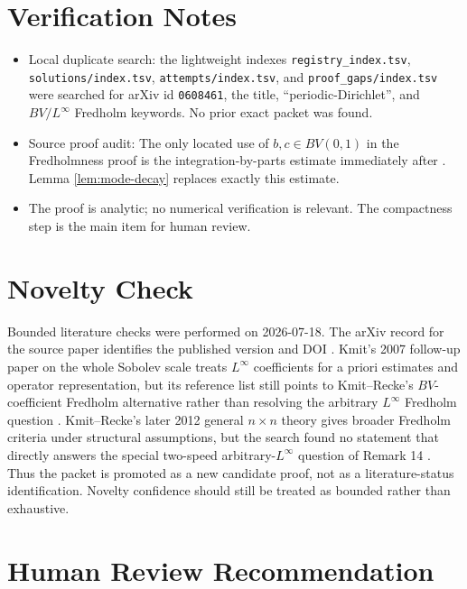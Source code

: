\documentclass[11pt]{article}
\begin{document}
\section*{Verification Notes}

\begin{itemize}
\item Local duplicate search: the lightweight indexes
\texttt{registry\_index.tsv}, \texttt{solutions/index.tsv},
\texttt{attempts/index.tsv}, and \texttt{proof\_gaps/index.tsv} were searched
for arXiv id \texttt{0608461}, the title, ``periodic-Dirichlet'', and
\(BV/L^\infty\) Fredholm keywords. No prior exact packet was found.
\item Source proof audit: The only located use of \(b,c\in BV(0,1)\) in the
Fredholmness proof is the integration-by-parts estimate immediately after
\cite[(4.10)]{KmitRecke2007}. Lemma \ref{lem:mode-decay} replaces exactly this
estimate.
\item The proof is analytic; no numerical verification is relevant. The
compactness step is the main item for human review.
\end{itemize}

\section*{Novelty Check}

Bounded literature checks were performed on 2026-07-18. The arXiv record for
the source paper identifies the published version and DOI \cite{KmitRecke2007}.
Kmit's 2007 follow-up paper on the whole Sobolev scale treats \(L^\infty\)
coefficients for a priori estimates and operator representation, but its
reference list still points to Kmit--Recke's \(BV\)-coefficient Fredholm
alternative rather than resolving the arbitrary \(L^\infty\) Fredholm question
\cite{Kmit2007WholeScale}. Kmit--Recke's later 2012 general \(n\times n\)
theory gives broader Fredholm criteria under structural assumptions, but the
search found no statement that directly answers the special two-speed
arbitrary-\(L^\infty\) question of Remark 14 \cite{KmitRecke2012}. Thus the
packet is promoted as a new candidate proof, not as a literature-status
identification. Novelty confidence should still be treated as bounded rather
than exhaustive.

\section*{Human Review Recommendation}
\end{document}
